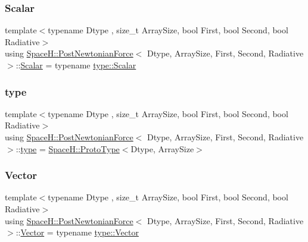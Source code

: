\subsubsection{\texorpdfstring{Scalar}{Scalar}}
{\footnotesize\ttfamily template$<$typename Dtype , size\+\_\+t Array\+Size, bool First, bool Second, bool Radiative$>$ \\
using \mbox{\hyperlink{class_space_h_1_1_post_newtonian_force}{Space\+H\+::\+Post\+Newtonian\+Force}}$<$ Dtype, Array\+Size, First, Second, Radiative $>$\+::\mbox{\hyperlink{class_space_h_1_1_post_newtonian_force_a4c47b7292998ddda142216f6b614bedd}{Scalar}} =  typename \mbox{\hyperlink{struct_space_h_1_1_proto_type_af3c8245d83d9db64749882920de5c274}{type\+::\+Scalar}}}

\mbox{\label{class_space_h_1_1_post_newtonian_force_a51db63e61431148f38ada0ca11f55ae6}} 
\subsubsection{\texorpdfstring{type}{type}}
{\footnotesize\ttfamily template$<$typename Dtype , size\+\_\+t Array\+Size, bool First, bool Second, bool Radiative$>$ \\
using \mbox{\hyperlink{class_space_h_1_1_post_newtonian_force}{Space\+H\+::\+Post\+Newtonian\+Force}}$<$ Dtype, Array\+Size, First, Second, Radiative $>$\+::\mbox{\hyperlink{class_space_h_1_1_post_newtonian_force_a51db63e61431148f38ada0ca11f55ae6}{type}} =  \mbox{\hyperlink{struct_space_h_1_1_proto_type}{Space\+H\+::\+Proto\+Type}}$<$Dtype, Array\+Size$>$}

\mbox{\label{class_space_h_1_1_post_newtonian_force_ae9a942fc7a0c5fa260d7e8a17cb107bd}} 
\subsubsection{\texorpdfstring{Vector}{Vector}}
{\footnotesize\ttfamily template$<$typename Dtype , size\+\_\+t Array\+Size, bool First, bool Second, bool Radiative$>$ \\
using \mbox{\hyperlink{class_space_h_1_1_post_newtonian_force}{Space\+H\+::\+Post\+Newtonian\+Force}}$<$ Dtype, Array\+Size, First, Second, Radiative $>$\+::\mbox{\hyperlink{class_space_h_1_1_post_newtonian_force_ae9a942fc7a0c5fa260d7e8a17cb107bd}{Vector}} =  typename \mbox{\hyperlink{struct_space_h_1_1_proto_type_a316b81f4660b2b4fab14a8e1f23b6089}{type\+::\+Vector}}}



